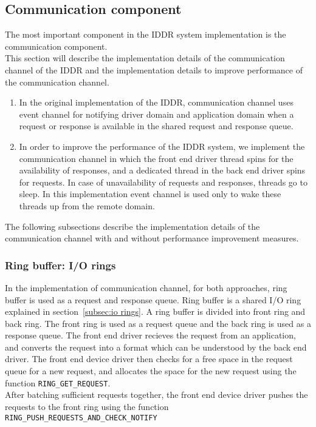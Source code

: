 \subsection{Communication component}
The most important component in the IDDR system implementation is the communication component. 
\\
This section will describe the implementation details of the communication channel of the IDDR and the implementation details to improve performance of the communication channel.
\begin{enumerate}
\item In the original implementation of the IDDR, communication channel uses event channel for notifying driver domain and application domain when a request or response is available in the shared request and response queue.
\item In order to improve the performance of the IDDR system, we implement the communication channel in which the front end driver thread spins for the availability of responses, and a dedicated thread in the back end driver spins for requests. In case of unavailability of requests and responses, threads go to sleep. In this implementation event channel is used only to wake these threads up from the remote domain.
\end{enumerate}

The following subsections describe the implementation details of the communication channel with and without performance improvement measures.

\subsubsection*{Ring buffer: I/O rings}
\label{subsec:ringbuf}
In the implementation of communication channel, for both approaches, ring buffer is used as a request and response queue. Ring buffer is a shared I/O ring explained in section~\ref{subsec:io rings}. A ring buffer is divided into front ring and back ring. The front ring is used as a request queue and the back ring is used as a response queue. The front end driver recieves the request from an application, and converts the request into a format which can be understood by the back end driver. The front end device driver then checks for a free space in the request queue for a new request, and allocates the space for the new request using the function \texttt{RING\_GET\_REQUEST}. 
\\
After batching sufficient requests together, the front end device driver pushes the requests to the front ring using the function \texttt{RING\_PUSH\_REQUESTS\_AND\_CHECK\_NOTIFY}


